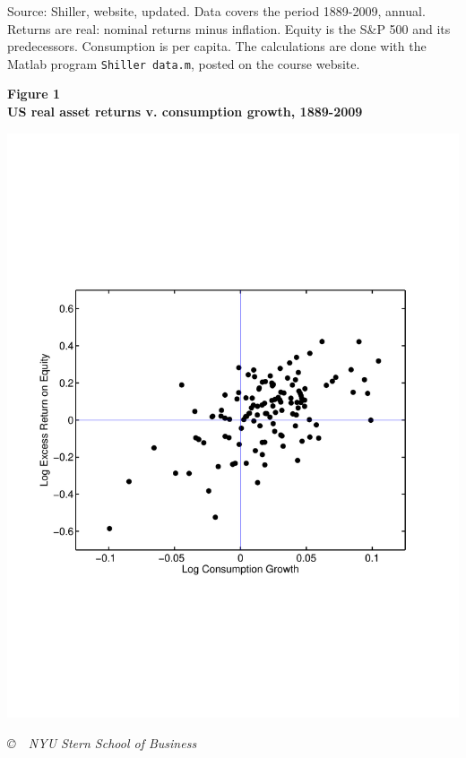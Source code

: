 \documentclass[11pt]{article}
\begin{document}
Source:  Shiller, website, updated.
Data covers the period 1889-2009, annual.
Returns are real:  nominal returns minus inflation.
Equity is the S\&P 500 and its predecessors.
Consumption is per capita.
The calculations are done with the Matlab program
{\tt Shiller data.m},
posted on the course website.

\pagebreak
{\large\bf Figure 1 \\ US real asset returns v. consumption growth, 1889-2009}

\includegraphics[width=\textwidth]{../Matlab/scatter_gxr.pdf}

\vfill \centerline{\it \copyright \ \number\year \
NYU Stern School of Business}
\end{document}
